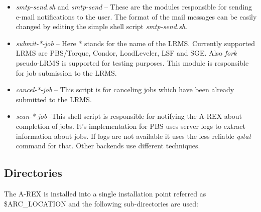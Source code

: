 \documentclass{article}                            %
\begin{document}
\begin{itemize}
\item \textit{smtp-send.sh} and \textit{smtp-send} -- These are the modules
responsible for sending e-mail notifications to the user. The format
of the mail messages can be easily changed by editing the simple shell
script \textit{smtp-send.sh}. 
\item \textit{submit-{*}-job} -- Here {*} stands for the name of the LRMS.
Currently supported LRMS are PBS/Torque, Condor, LoadLeveler, LSF
and SGE. Also \emph{fork} pseudo-LRMS is supported for testing purposes.
This module is responsible for job submission to the LRMS.
\item \textit{cancel-{*}-job} -- This script is for canceling jobs which
have been already submitted to the LRMS.
\item \textit{scan-{*}-job} -This shell script is responsible for notifying
the A-REX about completion of jobs. It's implementation for PBS uses
server logs to extract information about jobs. If logs are not available
it uses the less reliable \emph{qstat} command for that. Other backends
use different techniques.
\end{itemize}

\subsection{Directories}

The A-REX is installed into a single installation point referred as
\$ARC\_LOCATION and the following sub-directories are used:
\end{document}
